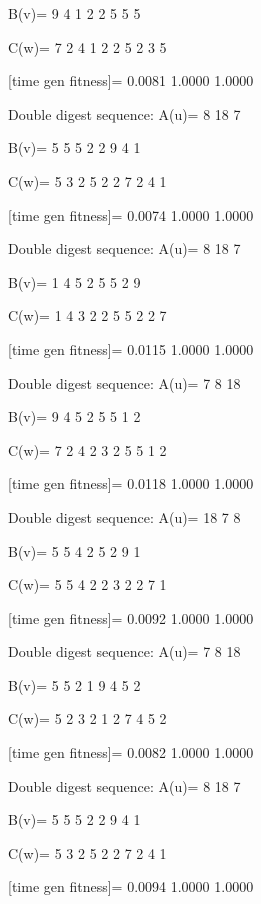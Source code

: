 B(v)=
     9     4     1     2     2     5     5     5

C(w)=
     7     2     4     1     2     2     5     2     3     5

[time gen fitness]=
    0.0081    1.0000    1.0000

Double digest sequence:
A(u)=
     8    18     7

B(v)=
     5     5     5     2     2     9     4     1

C(w)=
     5     3     2     5     2     2     7     2     4     1

[time gen fitness]=
    0.0074    1.0000    1.0000

Double digest sequence:
A(u)=
     8    18     7

B(v)=
     1     4     5     2     5     5     2     9

C(w)=
     1     4     3     2     2     5     5     2     2     7

[time gen fitness]=
    0.0115    1.0000    1.0000

Double digest sequence:
A(u)=
     7     8    18

B(v)=
     9     4     5     2     5     5     1     2

C(w)=
     7     2     4     2     3     2     5     5     1     2

[time gen fitness]=
    0.0118    1.0000    1.0000

Double digest sequence:
A(u)=
    18     7     8

B(v)=
     5     5     4     2     5     2     9     1

C(w)=
     5     5     4     2     2     3     2     2     7     1

[time gen fitness]=
    0.0092    1.0000    1.0000

Double digest sequence:
A(u)=
     7     8    18

B(v)=
     5     5     2     1     9     4     5     2

C(w)=
     5     2     3     2     1     2     7     4     5     2

[time gen fitness]=
    0.0082    1.0000    1.0000

Double digest sequence:
A(u)=
     8    18     7

B(v)=
     5     5     5     2     2     9     4     1

C(w)=
     5     3     2     5     2     2     7     2     4     1

[time gen fitness]=
    0.0094    1.0000    1.0000

